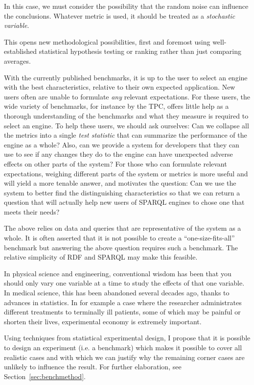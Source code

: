 \documentclass{llncs}
\begin{document}
In this case, we must consider the possibility that the random noise
can influence the conclusions. Whatever metric is used, it should be
treated as a \emph{stochastic variable}.

This opens new methodological possibilities, first and foremost
using well-established statistical hypothesis testing or ranking
rather than just comparing averages.

With the currently published benchmarks, it is up to the user to
select an engine with the best characteristics, relative to their own
expected application. New users often are unable to formulate
\emph{any} relevant expectations. For these users, the wide variety of
benchmarks, for instance by the TPC, offers little help as a thorough
understanding of the benchmarks and what they measure is required to
select an engine. To help these users, we should ask ourselves:
Can we collapse all the metrics into a single \emph{test
  statistic} that can summarize the performance of the engine as a
whole? Also, can we provide a system for developers that they can use
to see if any changes they do to the engine can have unexpected adverse
effects on other parts of the system? For those who can formulate
relevant expectations, weighing different parts of the system or
metrics is more useful and will yield a more tenable answer, and
motivates the question: Can we use the system to better find the
distinguishing characteristics so that we can return a question that
will actually help new users of SPARQL engines to chose one that meets
their needs?

The above relies on data and queries that are representative of the
system as a whole. It is often asserted that it is not possible to
create a ``one-size-fits-all'' benchmark but answering the above
question requires such a benchmark. The relative simplicity of RDF and
SPARQL may make this feasible.

In physical science and engineering, conventional wisdom has been that
you should only vary one variable at a time to study the effects of
that one variable. In medical science, this has been abandoned several
decades ago, thanks to advances in statistics. In for example a case where
the researcher administrates different treatments to terminally ill
patients, some of which may be painful or shorten their lives,
experimental economy is extremely important.

Using techniques from statistical experimental design, I propose
that it is possible to design an experiment (i.e. a benchmark) which
makes it possible to cover all realistic cases and with which we can justify
why the remaining corner cases are unlikely to influence the
result. For further elaboration, see Section~\ref{sec:benchmethod}.
\end{document}
